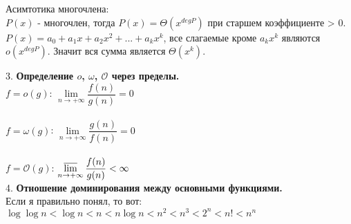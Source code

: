 \documentclass[12pt]{article}
\begin{document}
Асимтотика многочлена:\\
$P(x)$ - многочлен, тогда $P(x) = \Theta(x^{degP})$ при старшем коэффициенте > 0.\\
$P(x) = a_0 + a_1x + a_2x^2 + ... + a_kx^k$, все слагаемые кроме $a_kx^k$ являются $o(x^{degP})$. Значит вся сумма является $\Theta(x^k)$.

3. \textbf{Определение $o$, $\omega$, $\mathcal{O}$ через пределы.}\\
$f = o(g)$: $\lim\limits_{n\to +\infty} \dfrac{f(n)}{g(n)}=0$\\
\\
$f = \omega(g)$: $\lim\limits_{n\to +\infty} \dfrac{g(n)}{f(n)}=0$\\
\\
$f = \mathcal{O}(g)$: $\varlimsup\limits_{n\to +\infty} \dfrac{f(n)}{g(n)}<\infty$\\

4. \textbf{Отношение доминирования между основными функциями.}\\
Если я правильно понял, то вот:\\
$\log\log n < \log n < n < n\log n < n^2 < n^3 < 2^n < n! < n^n$
\end{document}
